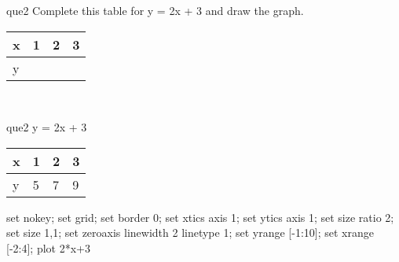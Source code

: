 \documentclass[13.5pt, varwidth=true]{beamer}
\begin{document}
\begin{frame}[shrink=19,fragile]
	\begin{beamercolorbox}[rounded=true, left, shadow=true,wd=14.8cm]{que2}
		 Complete this table for y = 2x + 3 and draw the graph. \\[0.3cm] \renewcommand{\arraystretch}{1.2}\begin{tabular}{|C|C|C|C|} \hline x & 1 & 2 & 3 \\ \hline y & & & \\ \hline \end{tabular}\\[0.3cm]
	\end{beamercolorbox}
\end{frame}
\begin{frame}[shrink=19,fragile]
	\begin{beamercolorbox}[rounded=true, left, shadow=true,wd=14.8cm]{que2}
		y = 2x + 3\renewcommand{\arraystretch}{1.2}\begin{tabular}{|C|C|C|C|} \hline x & 1 & 2 & 3 \\ \hline y & 5 & 7 & 9\\ \hline \end{tabular}\begin{gnuplot}[terminal=pdf] set nokey; set grid; set border 0; set xtics axis 1; set ytics axis 1; set size ratio 2; set size 1,1; set zeroaxis linewidth 2 linetype 1; set yrange [-1:10]; set xrange [-2:4]; plot 2*x+3 \end{gnuplot}
	\end{beamercolorbox}
\end{frame}
\end{document}
